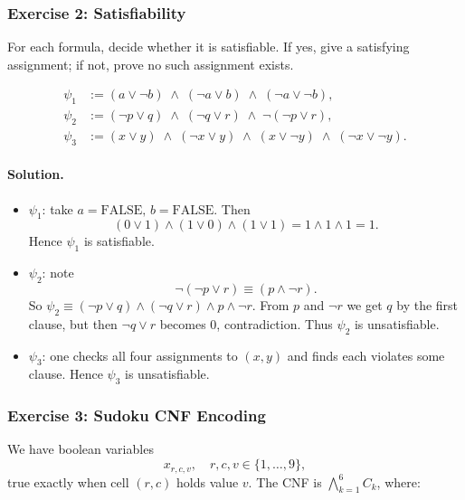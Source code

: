 \documentclass{article}
\theoremstyle{theorem}
\theoremstyle{definition}
\theoremstyle{remark}
\begin{document}
\subsubsection{Exercise 2: Satisfiability}  
For each formula, decide whether it is satisfiable.  If yes, give a satisfying
assignment; if not, prove no such assignment exists.

\[
\begin{aligned}
\psi_1 &:= (a\lor\neg b)\;\land\;(\neg a\lor b)\;\land\;(\neg a\lor\neg b),\\
\psi_2 &:= (\neg p\lor q)\;\land\;(\neg q\lor r)\;\land\;\neg(\neg p\lor r),\\
\psi_3 &:= (x\lor y)\;\land\;(\neg x\lor y)\;\land\;(x\lor\neg y)\;\land\;(\neg x\lor\neg y).
\end{aligned}
\]

\paragraph{Solution.}
\begin{itemize}
  \item \(\psi_1\): take \(a=\mathrm{FALSE},\,b=\mathrm{FALSE}\).  Then
  \[
    (0\lor1)\land(1\lor0)\land(1\lor1)
    =1\land1\land1=1.
  \]
  Hence \(\psi_1\) is satisfiable.

  \item \(\psi_2\): note
  \[
    \neg(\neg p\lor r)\equiv(p\land\neg r).
  \]
  So \(\psi_2\equiv(\neg p\lor q)\land(\neg q\lor r)\land p\land\neg r\).
  From \(p\) and \(\neg r\) we get \(q\) by the first clause, but then
  \(\neg q\lor r\) becomes \(0\), contradiction.  Thus \(\psi_2\) is
  unsatisfiable.

  \item \(\psi_3\): one checks all four assignments to \((x,y)\) and finds
  each violates some clause.  Hence \(\psi_3\) is unsatisfiable.
\end{itemize}

\subsubsection{Exercise 3: Sudoku CNF Encoding}  
We have boolean variables
\[
  x_{r,c,v},\quad
  r,c,v\in\{1,\dots,9\},
\]
true exactly when cell \((r,c)\) holds value \(v\).  The CNF is
\(\bigwedge_{k=1}^6 C_k\), where:
\end{document}
